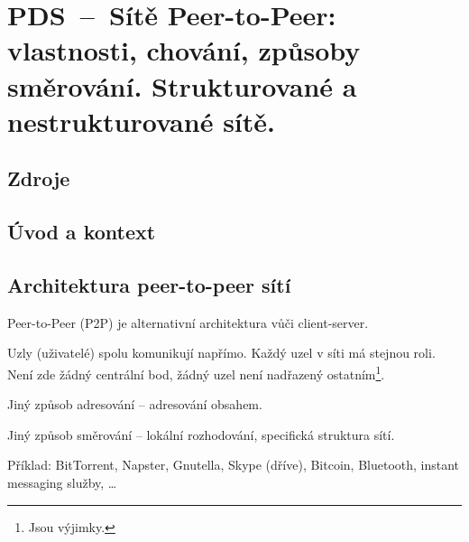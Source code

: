 

\graphicspath{{pds/peer_to_peer_site/figures}}


\chapter{PDS~--~Sítě Peer-to-Peer: vlastnosti, chování, způsoby směrování. Strukturované a nestrukturované sítě.}



\section{Zdroje}

\begin{compactitem}
    \item {}
    \item {}
\end{compactitem}


\section{Úvod a kontext}



\section{Architektura peer-to-peer sítí}

\begin{compactitem}
    \item Peer-to-Peer (P2P) je alternativní architektura vůči client-server.
    \item Uzly (uživatelé) spolu komunikují napřímo. Každý uzel v síti má stejnou roli. Není zde žádný centrální bod, žádný uzel není nadřazený ostatním\footnote{Jsou výjimky.}.
    \item Jiný způsob adresování -- adresování obsahem.
    \item Jiný způsob směrování -- lokální rozhodování, specifická struktura sítí.
    \item Příklad: BitTorrent, Napster, Gnutella, Skype (dříve), Bitcoin, Bluetooth, instant messaging služby, \dots
\end{compactitem}

